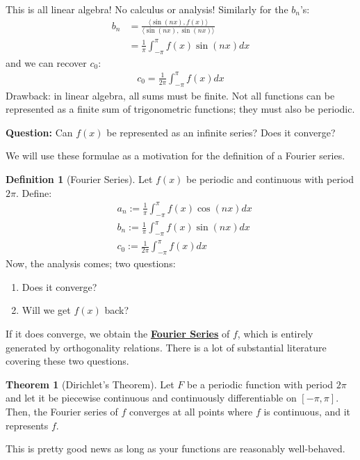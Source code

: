 \documentclass[11pt]{scrartcl}
\theoremstyle{definition}
\newtheorem{theorem}{Theorem}
\newtheorem{definition}{Definition}
\theoremstyle{remark}
\newcommand{\dfn}[1]{\textbf{\underline{#1}}}
\begin{document}
This is all linear algebra! No calculus or analysis! Similarly for the $b_n$'s: 
\begin{align}
b_n & = \frac{\langle \sin(nx), f(x) \rangle}{\langle \sin (nx), \sin (nx) \rangle}	\\
& = \frac{1}{\pi} \int_{-\pi}^\pi f(x) \sin(nx) dx 
\end{align}
and we can recover $c_0$: 
\begin{align}	
	c_0 = \frac{1}{2 \pi} \int_{-\pi}^\pi f(x) dx 	
\end{align}
Drawback: in linear algebra, all sums must be finite. Not all functions can be represented as a finite sum of trigonometric functions; they must also be periodic. 


\textbf{Question:} Can $f(x)$ be represented as an infinite series? Does it converge? 


We will use these formulae as a motivation for the definition of a Fourier series. 

\begin{definition}[Fourier Series]
	Let $f(x)$ be periodic and continuous with period $2 \pi$. Define: 
	\begin{align}
		& a_n := \frac{1}{\pi} \int_{-\pi}^\pi f(x) \cos (nx) dx \\
		& b_n := \frac{1}{\pi} \int_{-\pi}^\pi f(x) \sin (nx) dx \\
		& c_0 := \frac{1}{2 \pi} \int_{-\pi}^\pi f(x) dx 	
	\end{align}
	Now, the analysis comes; two questions: 
	\begin{enumerate}[noitemsep]
		\item Does it converge?
		\item Will we get $f(x)$ back?
	\end{enumerate}
	If it does converge, we obtain the \dfn{Fourier Series} of $f$, which is entirely generated by orthogonality relations. There is a lot of substantial literature covering these two questions. 
\end{definition}

\begin{theorem}[Dirichlet's Theorem]
	Let $F$ be a periodic function with period $ 2 \pi$ and let it be piecewise continuous and continuously differentiable on $[-\pi, \pi]$. Then, the Fourier series of $f$ converges at all points where $f$ is continuous, and it represents $f$. 
\end{theorem}
This is pretty good news as long as your functions are 
reasonably well-behaved. 
\end{document}
